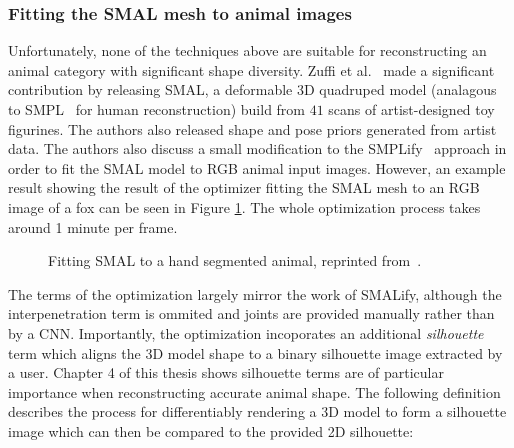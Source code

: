     \subsubsection{Fitting the SMAL mesh to animal images}
    Unfortunately, none of the techniques above are suitable for reconstructing an animal category with significant shape diversity.     Zuffi et al.~\cite{zuffi2017menagerie} made a significant contribution by releasing SMAL, a deformable 3D quadruped model (analagous to SMPL~\cite{loper15smpl} for human reconstruction) build from $41$ scans of artist-designed toy figurines. The authors also released shape and pose priors generated from artist data. The authors also discuss a small modification to the SMPLify~ approach in order to fit the SMAL model to RGB animal input images. However, an example result showing the result of the optimizer fitting the SMAL mesh to an RGB image of a fox can be seen in Figure \ref{fig:smalify}. The whole optimization process takes around 1 minute per frame. 

    \begin{figure}[H] %
        \caption{Fitting SMAL to a hand segmented animal, reprinted from~\cite{zuffi2017menagerie}.}
        \label{fig:smalify}
    \end{figure}

    The terms of the optimization largely mirror the work of SMALify, although the interpenetration term is ommited and joints are provided manually rather than by a CNN. Importantly, the optimization incoporates an additional \emph{silhouette} term which aligns the 3D model shape to a binary silhouette image extracted by a user. Chapter 4 of this thesis shows silhouette terms are of particular importance when reconstructing accurate animal shape. The following definition describes the process for differentiably rendering a 3D model to form a silhouette image which can then be compared to the provided 2D silhouette:


